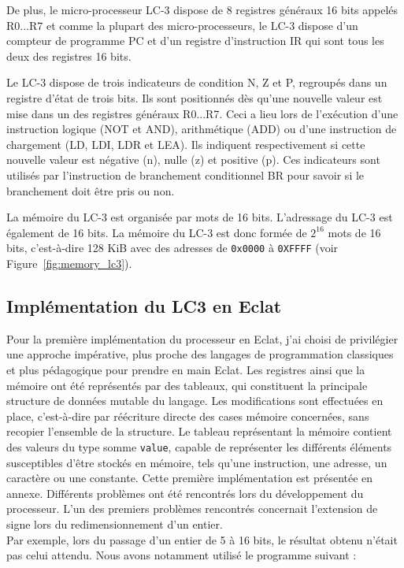 \documentclass{article}
\begin{document}
De plus, le micro-processeur LC-3 dispose de 8 registres généraux 16 bits appelés R0...R7 et comme la plupart des micro-processeurs, le LC-3 
dispose d’un compteur de programme PC et d’un registre d’instruction IR qui sont tous les deux des registres 16 bits.

Le LC-3 dispose de trois indicateurs de condition N, Z et P, regroupés dans un registre d'état de trois bits.
Ils sont positionnés dès qu’une nouvelle valeur est mise dans un des registres généraux
R0...R7. Ceci a lieu lors de l’exécution d’une instruction logique (NOT et AND), arithmétique (ADD)
ou d’une instruction de chargement (LD, LDI, LDR et LEA). Ils indiquent respectivement si cette
nouvelle valeur est négative (n), nulle (z) et positive (p). Ces indicateurs sont utilisés par l’instruction
de branchement conditionnel BR pour savoir si le branchement doit être pris ou non.

La mémoire du LC-3 est organisée par mots de 16 bits. L’adressage du LC-3 est également de 16 bits.
La mémoire du LC-3 est donc formée de $2^{16}$ mots de 16 bits, c’est-à-dire 128 KiB avec des adresses
de \texttt{0x0000} à \texttt{0XFFFF} (voir Figure~\ref{fig:memory_lc3}).

\subsection{Implémentation du LC3 en Eclat}

Pour la première implémentation du processeur en Eclat, j'ai choisi de privilégier une approche impérative, plus proche des langages de programmation 
classiques et plus pédagogique pour prendre en main Eclat.
Les registres ainsi que la mémoire ont été représentés par des tableaux, qui constituent la principale structure de données mutable du langage. 
Les modifications sont effectuées en place, c'est-à-dire par réécriture directe des cases mémoire concernées, sans recopier l'ensemble de la structure.
Le tableau représentant la mémoire contient des valeurs du type somme \texttt{value}, capable de représenter les différents éléments susceptibles 
d'être stockés en mémoire, tels qu'une instruction, une adresse, un caractère ou une constante. Cette première implémentation est présentée en annexe.
Différents problèmes ont été rencontrés lors du développement du processeur.
L'un des premiers problèmes rencontrés concernait l'extension de signe lors du redimensionnement d'un entier. 
\\
Par exemple, lors du passage d'un entier de 5 à 16 bits, le résultat obtenu n'était pas celui attendu. Nous avons notamment utilisé le programme suivant :
\end{document}
